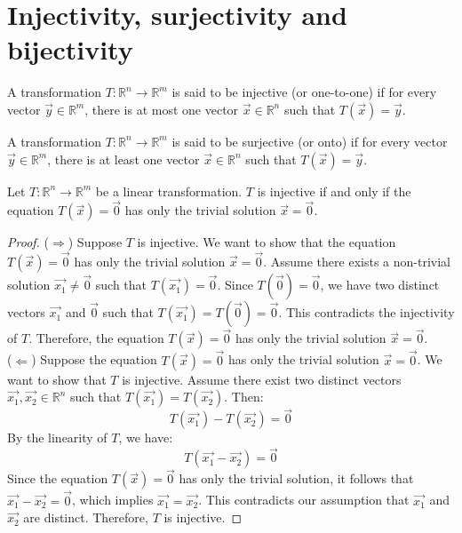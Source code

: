 \section{Injectivity, surjectivity and bijectivity}
\begin{definition}
    A transformation $T: \mathbb{R}^n \to \mathbb{R}^m$ is said to be injective (or one-to-one) if for every vector $\vec{y} \in \mathbb{R}^m$, there is at most one vector $\vec{x} \in \mathbb{R}^n$ such that $T(\vec{x}) = \vec{y}$.
\end{definition}

\begin{definition}
    A transformation $T: \mathbb{R}^n \to \mathbb{R}^m$ is said to be surjective (or onto) if for every vector $\vec{y} \in \mathbb{R}^m$, there is at least one vector $\vec{x} \in \mathbb{R}^n$ such that $T(\vec{x}) = \vec{y}$.
\end{definition}

\begin{theorem}
    Let $T: \mathbb{R}^n \to \mathbb{R}^m$ be a linear transformation. $T$ is injective if and only if the equation $T(\vec{x}) = \vec{0}$ has only the trivial solution $\vec{x} = \vec{0}$.
\end{theorem}
\begin{proof}
    ($\Rightarrow$) Suppose $T$ is injective. We want to show that the equation $T(\vec{x}) = \vec{0}$ has only the trivial solution $\vec{x} = \vec{0}$. Assume there exists a non-trivial solution $\vec{x_1} \neq \vec{0}$ such that $T(\vec{x_1}) = \vec{0}$. Since $T(\vec{0}) = \vec{0}$, we have two distinct vectors $\vec{x_1}$ and $\vec{0}$ such that $T(\vec{x_1}) = T(\vec{0}) = \vec{0}$. This contradicts the injectivity of $T$. Therefore, the equation $T(\vec{x}) = \vec{0}$ has only the trivial solution $\vec{x} = \vec{0}$. \\
    ($\Leftarrow$) Suppose the equation $T(\vec{x}) = \vec{0}$ has only the trivial solution $\vec{x} = \vec{0}$. We want to show that $T$ is injective. Assume there exist two distinct vectors $\vec{x_1}, \vec{x_2} \in \mathbb{R}^n$ such that $T(\vec{x_1}) = T(\vec{x_2})$. Then:
    \[
        T(\vec{x_1}) - T(\vec{x_2}) = \vec{0}
    \]
    By the linearity of $T$, we have:
    \[
        T(\vec{x_1} - \vec{x_2}) = \vec{0}
    \]
    Since the equation $T(\vec{x}) = \vec{0}$ has only the trivial solution, it follows that $\vec{x_1} - \vec{x_2} = \vec{0}$, which implies $\vec{x_1} = \vec{x_2}$. This contradicts our assumption that $\vec{x_1}$ and $\vec{x_2}$ are distinct. Therefore, $T$ is injective.
\end{proof}

